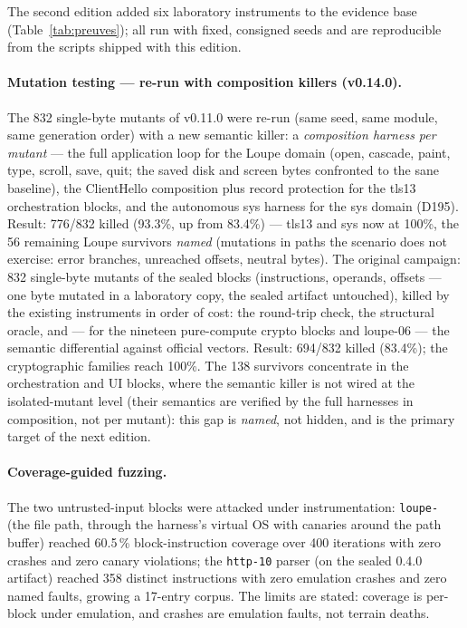 \documentclass[11pt,a4paper]{article}
\newcommand{\code}[1]{\texttt{\small #1}}
\begin{document}
The second edition added six laboratory instruments to the evidence base
(Table~\ref{tab:preuves}); all run with fixed, consigned seeds and are
reproducible from the scripts shipped with this edition.

\paragraph{Mutation testing --- re-run with composition killers (v0.14.0).} The 832
single-byte mutants of v0.11.0 were re-run (same seed, same module,
same generation order) with a new semantic killer: a \emph{composition
harness per mutant} --- the full application loop for the Loupe domain
(open, cascade, paint, type, scroll, save, quit; the saved disk and
screen bytes confronted to the sane baseline), the ClientHello composition
plus record protection for the tls13 orchestration blocks, and the
autonomous sys harness for the sys domain (D195). Result: 776/832
killed (93.3\%, up from 83.4\%) --- tls13 and sys now at 100\%, the
56 remaining Loupe survivors \emph{named} (mutations in paths the
scenario does not exercise: error branches, unreached offsets,
neutral bytes). The original campaign: 832 single-byte mutants of the sealed blocks
(instructions, operands, offsets --- one byte mutated in a laboratory copy,
the sealed artifact untouched), killed by the existing instruments in
order of cost: the round-trip check, the structural oracle, and --- for
the nineteen pure-compute crypto blocks and loupe-06 --- the semantic
differential against official vectors. Result: 694/832 killed (83.4\%);
the cryptographic families reach 100\%. The 138 survivors concentrate in
the orchestration and UI blocks, where the semantic killer is not wired
at the isolated-mutant level (their semantics are verified by the full
harnesses in composition, not per mutant): this gap is \emph{named}, not
hidden, and is the primary target of the next edition.

\paragraph{Coverage-guided fuzzing.} The two untrusted-input blocks were
attacked under instrumentation: \code{loupe-} (the file path, through
the harness's virtual OS with canaries around the path buffer) reached
60.5\,\% block-instruction coverage over 400 iterations with zero crashes
and zero canary violations; the \code{http-10} parser (on the sealed 0.4.0
artifact) reached 358 distinct instructions with zero emulation crashes
and zero named faults, growing a 17-entry corpus. The limits are stated:
coverage is per-block under emulation, and crashes are emulation faults,
not terrain deaths.
\end{document}
